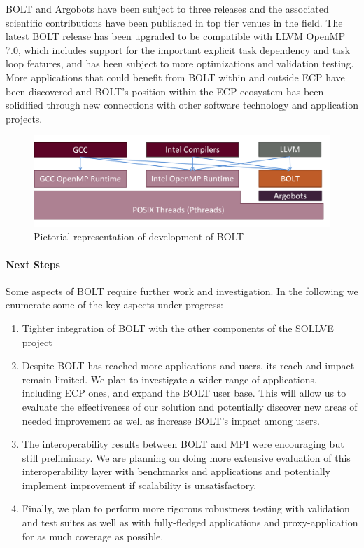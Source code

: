 BOLT and Argobots have been subject to three releases and the
associated scientific contributions have been published in top tier
venues in the field.  The latest BOLT release has been upgraded to be
compatible with LLVM OpenMP 7.0, which includes support for the
important explicit task dependency and task loop features, and has
been subject to more optimizations and validation testing. More
applications that could benefit from BOLT within and outside ECP have
been discovered and BOLT's position within the ECP ecosystem has been
solidified through new connections with other software technology and
application projects.

\begin{figure}[htb]
  \centering
  \vspace{2.0ex}
  \includegraphics[width=0.9\columnwidth]{projects/2.3.1-PMR/2.3.1.13-SOLLVE/SOLLVE-BOLT.pdf}
  \caption{\label{fig:sollve-bolt}Pictorial representation of development of BOLT}
  \vspace{2.0ex}
\end{figure}

\paragraph{Next Steps}

Some aspects of BOLT require further work and investigation.  In the
following we enumerate some of the key aspects under progress:

\begin{enumerate}

\item Tighter integration of BOLT with the other components of the
SOLLVE project

\item Despite BOLT has reached more applications and users, its reach
and impact remain limited.  We plan to investigate a wider range of
applications, including ECP ones, and expand the BOLT user base.  This
will allow us to evaluate the effectiveness of our solution and
potentially discover new areas of needed improvement as well as
increase BOLT's impact among users.

\item The interoperability results between BOLT and MPI were
  encouraging but still preliminary.  We are planning on doing more
  extensive evaluation of this interoperability layer with benchmarks
  and applications and potentially implement improvement if
  scalability is unsatisfactory.

\item Finally, we plan to perform more rigorous robustness testing
  with validation and test suites as well as with fully-fledged
  applications and proxy-application for as much coverage as possible.

\end{enumerate}
